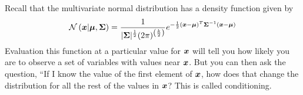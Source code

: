 \documentclass[../../main.tex]{subfiles}
\begin{document}
Recall that the multivariate normal distribution has a density function given
by
\begin{equation}
    \mathcal{N}\left(\boldsymbol{x}| \boldsymbol{\mu}, \boldsymbol{\Sigma} \right)
    = \frac{1}{
            |\boldsymbol{\Sigma}|^\frac{1}{2} (2\pi)^{\left(\frac{k}{2}\right)}
        }
        e^{
            -\frac{1}{2}
            (\boldsymbol{x} - \boldsymbol{\mu})^T
            \boldsymbol{\Sigma}^{-1}
            (\boldsymbol{x} - \boldsymbol{\mu})
    }
\end{equation}
Evaluation this function at a particular value for $\boldsymbol{x}$ will tell you how
likely you are to observe a set of variables with values near $\boldsymbol{x}$. But you
can then ask the question, ``If I know the value of the first element of
$\boldsymbol{x}$, how does that change the distribution for all the rest of the values
in $\boldsymbol{x}$?  This is called conditioning.
\end{document}
